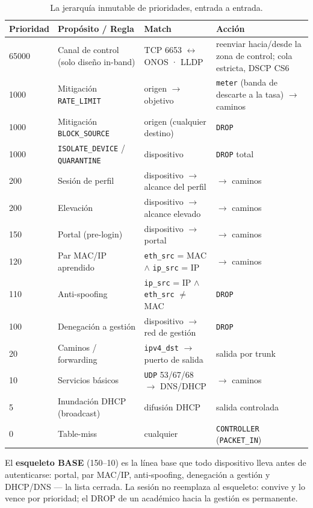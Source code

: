 \documentclass[11pt,a4paper]{report}
\begin{document}
\begin{table}[h!]
\centering
\small
\begin{tabularx}{\linewidth}{lp{4.4cm}p{4.4cm}X}
\toprule
\textbf{Prioridad} & \textbf{Propósito / Regla} & \textbf{Match} & \textbf{Acción} \\
\midrule
65000 & Canal de control (solo diseño in-band) & TCP 6653 $\leftrightarrow$ ONOS · LLDP & reenviar hacia/desde la zona de control; cola estricta, DSCP CS6 \\
1000 & Mitigación \texttt{RATE\_LIMIT} & origen $\rightarrow$ objetivo & \texttt{meter} (banda de descarte a la tasa) $\rightarrow$ caminos \\
1000 & Mitigación \texttt{BLOCK\_SOURCE} & origen (cualquier destino) & \texttt{DROP} \\
1000 & \texttt{ISOLATE\_DEVICE} / \texttt{QUARANTINE} & dispositivo & \texttt{DROP} total \\
200 & Sesión de perfil & dispositivo $\rightarrow$ alcance del perfil & $\rightarrow$ caminos \\
200 & Elevación & dispositivo $\rightarrow$ alcance elevado & $\rightarrow$ caminos \\
150 & Portal (pre-login) & dispositivo $\rightarrow$ portal & $\rightarrow$ caminos \\
120 & Par MAC/IP aprendido & \texttt{eth\_src} = MAC $\wedge$ \texttt{ip\_src} = IP & $\rightarrow$ caminos \\
110 & Anti-spoofing & \texttt{ip\_src} = IP $\wedge$ \texttt{eth\_src} $\neq$ MAC & \texttt{DROP} \\
100 & Denegación a gestión & dispositivo $\rightarrow$ red de gestión & \texttt{DROP} \\
20 & Caminos / forwarding & \texttt{ipv4\_dst} $\rightarrow$ puerto de salida & salida por trunk \\
10 & Servicios básicos & \texttt{UDP} 53/67/68 $\rightarrow$ DNS/DHCP & $\rightarrow$ caminos \\
5 & Inundación DHCP (broadcast) & difusión DHCP & salida controlada \\
0 & Table-miss & cualquier & \texttt{CONTROLLER} (\texttt{PACKET\_IN}) \\
\bottomrule
\end{tabularx}
\caption{La jerarquía inmutable de prioridades, entrada a entrada.}
\label{tab:pipeline}
\end{table}

El \textbf{esqueleto BASE} (150--10) es la línea base que todo dispositivo lleva antes de autenticarse: portal, par MAC/IP, anti-spoofing, denegación a gestión y DHCP/DNS — la lista cerrada. La sesión no reemplaza al esqueleto: convive y lo vence por prioridad; el DROP de un académico hacia la gestión es permanente.
\end{document}

